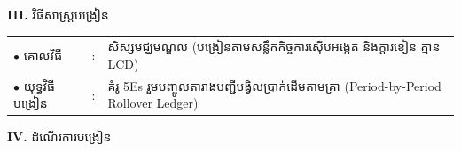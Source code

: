 \documentclass[a4paper,10pt]{article}
\newcommand{\en}[1]{{\TimesEn #1}}
\begin{document}
{\vspace{2pt}

\textbf{III.} {\muol វិធីសាស្រ្តបង្រៀន}\\[1pt]
\hspace*{0.45cm}%
\begin{tabular}{@{}l l L{14.85cm}@{}}
  $\bullet$ \hspace{0.25cm} គោលវិធី & : & សិស្សមជ្ឈមណ្ឌល (បង្រៀនតាមសន្លឹកកិច្ចការស៊ើបអង្កេត និងក្ដារខៀន គ្មាន \en{LCD}) \\
  $\bullet$ \hspace{0.25cm} យុទ្ធវិធីបង្រៀន & : & គំរូ \en{5Es} រួមបញ្ចូលតារាងបញ្ជីបង្វិលប្រាក់ដើមតាមគ្រា (\en{Period-by-Period Rollover Ledger}) \\
\end{tabular}
}

\vspace{2pt}

\textbf{IV.} {\muol ដំណើរការបង្រៀន}

\vspace{1pt}
\end{document}
